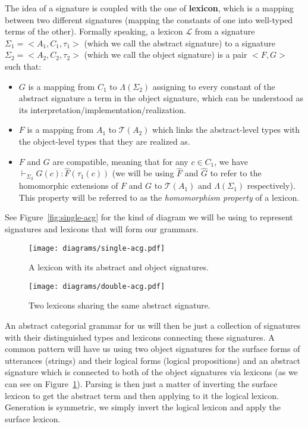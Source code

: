 The idea of a signature is coupled with the one of \textbf{lexicon},
which is a mapping between two different signatures (mapping the
constants of one into well-typed terms of the other). Formally speaking,
a lexicon $\mathcal{L}$ from a signature $\Sigma_1 = \mathopen{<}A_1,
C_1, \tau_1\mathclose{>}$ (which we call the abstract signature) to a
signature $\Sigma_2 = \mathopen{<}A_2, C_2, \tau_2\mathclose{>}$ (which
we call the object signature) is a pair $\mathopen{<}F, G\mathclose{>}$
such that:

\begin{itemize}
\item $G$ is a mapping from $C_1$ to $\Lambda(\Sigma_2)$ assigning to
  every constant of the abstract signature a term in the object
  signature, which can be understood as its
  interpretation/implementation/realization.
\item $F$ is a mapping from $A_1$ to $\mathcal{T}(A_2)$ which links the
  abstract-level types with the object-level types that they are
  realized as.
\item $F$ and $G$ are compatible, meaning that for any $c \in C_1$, we
  have $\vdash_{\Sigma_2} G(c) : \hat{F}(\tau_1(c))$ (we will be using
  $\hat{F}$ and $\hat{G}$ to refer to the homomorphic extensions of $F$
  and $G$ to $\mathcal{T}(A_1)$ and $\Lambda(\Sigma_1)$
  respectively). This property will be referred to as the
  \emph{homomorphism property} of a lexicon.
\end{itemize}

See Figure~\ref{fig:single-acg} for the kind of diagram we will be using
to represent signatures and lexicons that will form our grammars.

\begin{figure}
  \centering
  \begin{minipage}[b]{0.4\textwidth}
    \centering
    \texttt{[image: diagrams/single-acg.pdf]}
    \caption{{\label{fig:single-acg} A lexicon with its abstract
        and object signatures.}}
  \end{minipage}
  \qquad
  \begin{minipage}[b]{0.4\textwidth}
    \centering
    \texttt{[image: diagrams/double-acg.pdf]}
    \caption{{\label{fig:double-acg} Two lexicons sharing the same
        abstract signature.}}
  \end{minipage}
\end{figure}

An abstract categorial grammar for us will then be just a collection of
signatures with their distinguished types and lexicons connecting these
signatures. A common pattern will have us using two object signatures
for the surface forms of utterances (strings) and their logical forms
(logical propositions) and an abstract signature which is connected to
both of the object signatures via lexicons (as we can see on
Figure~\ref{fig:double-acg}). Parsing is then just a matter of inverting
the surface lexicon to get the abstract term and then applying to it the
logical lexicon. Generation is symmetric, we simply invert the logical
lexicon and apply the surface lexicon.

